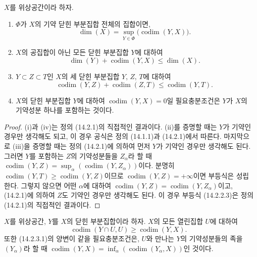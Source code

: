 \begin{proposition}[14.2.2]
\label{0.14.2.2-fr}
$X$를 위상공간이라 하자.
\begin{enumerate}
  \item[\rm(i)] $\Phi$가 $X$의 기약 닫힌 부분집합 전체의 집합이면,
  \[
    \dim(X)=\sup_{Y\in\Phi}\bigl(\operatorname{codim}(Y,X)\bigr).
    \tag{14.2.2.1}\label{0.14.2.2.1-fr}
  \]
  \item[\rm(ii)] $X$의 공집합이 아닌 모든 닫힌 부분집합 $Y$에 대하여
  \[
    \dim(Y)+\operatorname{codim}(Y,X)\leq\dim(X).
    \tag{14.2.2.2}\label{0.14.2.2.2-fr}
  \]
  \item[\rm(iii)] $Y\subset Z\subset T$인 $X$의 세 닫힌 부분집합
  $Y$, $Z$, $T$에 대하여
  \[
    \operatorname{codim}(Y,Z)+\operatorname{codim}(Z,T)
    \leq\operatorname{codim}(Y,T).
    \tag{14.2.2.3}\label{0.14.2.2.3-fr}
  \]
  \item[\rm(iv)] $X$의 닫힌 부분집합 $Y$에 대하여
  $\operatorname{codim}(Y,X)=0$일 필요충분조건은 $Y$가 $X$의
  기약성분 하나를 포함하는 것이다.
\end{enumerate}
\end{proposition}

\begin{proof}
(i)과 (iv)는 정의 (14.2.1)의 직접적인 결과이다. (ii)를 증명할 때는
$Y$가 기약인 경우만 생각해도 되고, 이 경우 공식은 정의 (14.1.1)과
(14.2.1)에서 따른다. 마지막으로 (iii)을 증명할 때는 정의 (14.2.1)에
의하여 먼저 $Y$가 기약인 경우만 생각해도 된다. 그러면 $Y$를 포함하는
$Z$의 기약성분들을 $Z_\alpha$라 할 때
$\operatorname{codim}(Y,Z)=
\sup_\alpha(\operatorname{codim}(Y,Z_\alpha))$이다. 분명히
$\operatorname{codim}(Y,T)\geq\operatorname{codim}(Y,Z)$이므로
$\operatorname{codim}(Y,Z)=+\infty$이면 부등식은 성립한다. 그렇지
않으면 어떤 $\alpha$에 대하여
$\operatorname{codim}(Y,Z)=\operatorname{codim}(Y,Z_\alpha)$이고,
(14.2.1)에 의하여 $Z$도 기약인 경우만 생각해도 된다. 이 경우
부등식 (14.2.2.3)은 정의 (14.2.1)의 직접적인 결과이다.
\end{proof}

\begin{proposition}[14.2.3]
\label{0.14.2.3-fr}
$X$를 위상공간, $Y$를 $X$의 닫힌 부분집합이라 하자. $X$의 모든
열린집합 $U$에 대하여
\[
  \operatorname{codim}(Y\cap U,U)\geq\operatorname{codim}(Y,X).
  \tag{14.2.3.1}\label{0.14.2.3.1-fr}
\]
또한 (14.2.3.1)의 양변이 같을 필요충분조건은, $U$와 만나는 $Y$의
기약성분들의 족을 $(Y_\alpha)$라 할 때
$\operatorname{codim}(Y,X)=
\inf_\alpha(\operatorname{codim}(Y_\alpha,X))$인 것이다.
\end{proposition}

